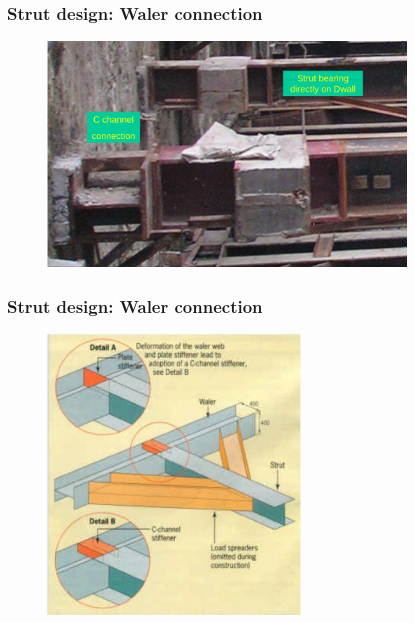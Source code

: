 \documentclass[notes]{beamer}
\begin{document}

\begin{frame}
\frametitle{Strut design: Waler connection}
\begin{figure}[ht]
	\centering
	\includegraphics[width=0.85\textwidth]{figs/c-channel-strut-dwall.png}
\end{figure}
\end{frame}

\begin{frame}
\frametitle{Strut design: Waler connection}
\begin{figure}[ht]
	\centering
	\includegraphics[width=0.6\textwidth]{figs/waler-strut.png}
\end{figure}
\end{frame}
\end{document}

